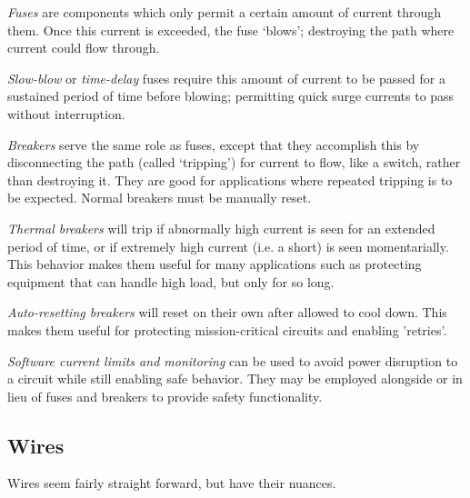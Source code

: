 \begin{asparaenum}
  \item \textit{Fuses} are components which only permit a certain amount of current through them. Once this current is exceeded, the fuse `blows'; destroying the path where current could flow through.
  \item \textit{Slow-blow} or \textit{time-delay} fuses require this amount of current to be passed for a sustained period of time before blowing; permitting quick surge currents to pass without interruption.
  \item \textit{Breakers} serve the same role as fuses, except that they accomplish this by disconnecting the path (called `tripping') for current to flow, like a switch, rather than destroying it. They are good for applications where repeated tripping is to be expected. Normal breakers must be manually reset.
  \item \textit{Thermal breakers} will trip if abnormally high current is seen for an extended period of time, or if extremely high current (i.e. a short) is seen momentarially. This behavior makes them useful for many applications such as protecting equipment that can handle high load, but only for so long.
  \item \textit{Auto-resetting breakers} will reset on their own after allowed to cool down. This makes them useful for protecting mission-critical circuits and enabling 'retries'.
  \item \textit{Software current limits and monitoring} can be used to avoid power disruption to a circuit while still enabling safe behavior. They may be employed alongside or in lieu of fuses and breakers to provide safety functionality.
\end{asparaenum}

\subsection{Wires}

Wires seem fairly straight forward, but have their nuances.

